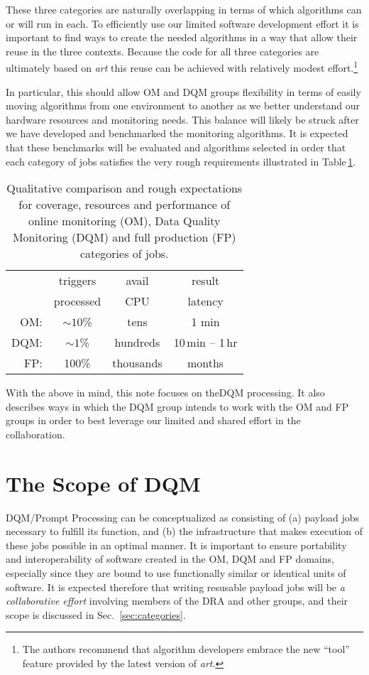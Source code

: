 \documentclass[pdftex,12pt,letter]{article}
\begin{document}
\noindent These three categories are naturally overlapping in terms of which algorithms
can or will run in each.  To efficiently use our limited software
development effort it is important to find ways to create the needed
algorithms in a way that allow their reuse in the three contexts.
Because the code for all three categories are ultimately based on
\textit{art} this reuse can be achieved with relatively modest
effort.\footnote{The authors recommend that algorithm developers
  embrace the new ``tool'' feature provided by the latest version of
  \textit{art}.}

In particular, this should allow OM and DQM groups
flexibility in terms of easily moving algorithms from one environment
to another as we better understand our hardware resources and
monitoring needs.  This balance will likely be struck after we have
developed and benchmarked the monitoring algorithms.  It is expected
that these benchmarks will be evaluated and algorithms selected in
order that each category of jobs satisfies the very rough requirements
illustrated in Table\,\ref{tab:contexts}.

\begin{table}[h]
  \centering
  \begin{tabular}[h]{r|ccc}
    & triggers & avail & result \\
    & processed &  CPU & latency \\
    \hline
    OM: & $\sim 10$\% & tens & 1 min \\
    DQM: & $\sim 1$\% & hundreds & 10\,min -- 1\,hr \\
    FP: & 100\% & thousands & months \\
  \end{tabular}
  \caption{Qualitative comparison and rough expectations for coverage, resources and performance of online monitoring (OM), Data Quality Monitoring (DQM) and full production (FP) categories of jobs.}
  \label{tab:contexts}
\end{table}

\noindent
With the above in mind, this note focuses on theDQM processing.  It also describes ways in which the
DQM group intends to work with the OM and FP groups in order to best leverage our
limited and shared effort in the collaboration.

\section{The Scope of DQM}

DQM/Prompt Processing can be conceptualized as consisting of (a) payload
jobs necessary to fulfill its function, and (b) the infrastructure that
makes execution of these jobs possible in an optimal manner.
It is important to ensure portability and
interoperability of software created in the OM, DQM and FP domains,
especially since they are bound to use functionally similar or identical
units of software. It is expected therefore that writing resusable payload
jobs will be \textit{a collaborative effort} involving members of the DRA
and other groups, and their  scope is discussed in Sec.~\ref{sec:categories}.
\end{document}
